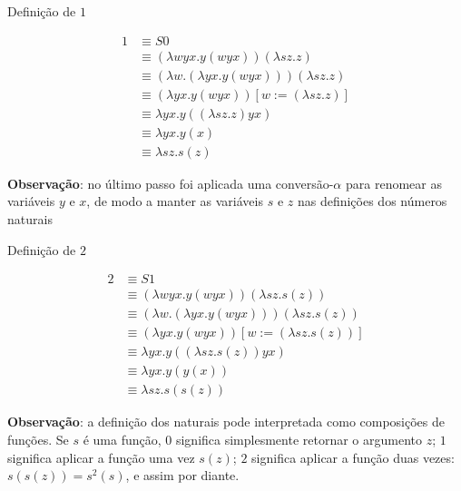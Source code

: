 \begin{frame}[fragile]{Definição de $1$}

    \begin{align*}
        1 &\equiv S0 \\
          &\equiv (\lambda wyx.y(wyx))(\lambda sz.z) \\
          &\equiv (\lambda w.(\lambda yx.y(wyx)))(\lambda sz.z) \\
          &\equiv (\lambda yx.y(wyx))[w:=(\lambda sz.z)] \\
          &\equiv \lambda yx.y((\lambda sz.z)yx) \\
          &\equiv \lambda yx.y(x) \\
          &\equiv \lambda sz.s(z)
    \end{align*}

    \vspace{0.1in}

    \textbf{Observação}: no último passo foi aplicada uma conversão-$\alpha$ para renomear
        as variáveis $y$ e $x$, de modo a manter as variáveis $s$ e $z$ nas definições dos
        números naturais
\end{frame}

\begin{frame}[fragile]{Definição de $2$}

    \begin{align*}
        2 &\equiv S1 \\
          &\equiv (\lambda wyx.y(wyx))(\lambda sz.s(z)) \\
          &\equiv (\lambda w.(\lambda yx.y(wyx)))(\lambda sz.s(z)) \\
          &\equiv (\lambda yx.y(wyx))[w:=(\lambda sz.s(z))] \\
          &\equiv \lambda yx.y((\lambda sz.s(z))yx) \\
          &\equiv \lambda yx.y(y(x)) \\
          &\equiv \lambda sz.s(s(z))
    \end{align*}

    \vspace{0.1in}

    \textbf{Observação}: a definição dos naturais pode interpretada como composições de funções.
        Se $s$ é uma função, $0$ significa simplesmente retornar o argumento $z$; $1$ 
        significa aplicar a função uma vez $s(z)$; $2$ significa aplicar a função duas vezes:
        $s(s(z)) = s^2(s)$, e assim por diante. 
\end{frame}
